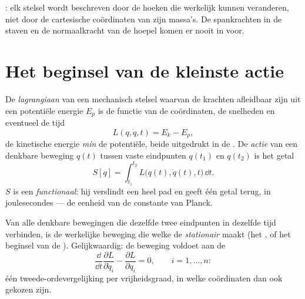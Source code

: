 \begin{omfigure}
{\small {}: elk stelsel wordt beschreven door de
hoeken die werkelijk kunnen veranderen, niet door de cartesische
coördinaten van zijn massa's. De spankrachten in de staven en de
normaalkracht van de hoepel komen er nooit in voor.}
\end{omfigure}

\section{Het beginsel van de kleinste actie}

\begin{definition}\label{def:b3:lagrangian-mechanics:action}
De \emph{lagrangiaan} van een mechanisch stelsel waarvan de krachten
afleidbaar zijn uit een potentiële energie $E_p$ is de functie van de
coördinaten, de snelheden en eventueel de tijd
\[
L(q, \dot q, t) = E_k - E_p ,
\]
de kinetische energie \emph{min} de potentiële, beide uitgedrukt in de
. De \emph{actie} van een denkbare beweging
$q(t)$ tussen vaste eindpunten $q(t_1)$ en $q(t_2)$ is het getal
\[
S[q] = \int_{t_1}^{t_2} L\big(q(t), \dot q(t), t\big)\,\dd t .
\]
$S$ is een \emph{functionaal}: hij verslindt een heel pad en geeft één
getal terug, in joulesecondes --- de eenheid van de constante van Planck.
\end{definition}

\begin{theorem}\label{thm:b3:lagrangian-mechanics:euler-lagrange}
Van alle denkbare bewegingen die dezelfde twee eindpunten in dezelfde tijd
verbinden, is de werkelijke beweging die welke de 
\emph{stationair} maakt (het \emph{}, of het beginsel
van de \emph{}). Gelijkwaardig: de beweging voldoet aan de
\emph{}
\[
\frac{\dd}{\dd t}\frac{\partial L}{\partial\dot q_i}
 - \frac{\partial L}{\partial q_i} = 0 ,
\qquad i = 1, \dots, n :
\]
één tweede-ordevergelijking per vrijheidsgraad, in welke coördinaten dan
ook gekozen zijn.
\end{theorem}

